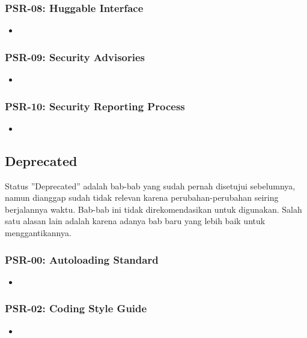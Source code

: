 \subsubsection{PSR-08: Huggable Interface}
\label{subsubsec:psr08}
\begin{itemize}
	\item
\end{itemize}

\subsubsection{PSR-09: Security Advisories}
\label{subsubsec:psr09}
\begin{itemize}
	\item
\end{itemize}

\subsubsection{PSR-10: Security Reporting Process}
\label{subsubsec:psr10}
\begin{itemize}
	\item
\end{itemize}


\subsection{Deprecated}
\label{subsec:deprecated}
Status ''Deprecated'' adalah bab-bab yang sudah pernah disetujui sebelumnya, namun dianggap sudah tidak relevan karena perubahan-perubahan seiring berjalannya waktu. Bab-bab ini tidak direkomendasikan untuk digunakan. Salah satu alasan lain adalah karena adanya bab baru yang lebih baik untuk menggantikannya.

\subsubsection{PSR-00: Autoloading Standard}
\label{subsubsec:psr00}
\begin{itemize}
	\item
\end{itemize}

\subsubsection{PSR-02: Coding Style Guide}
\label{subsubsec:psr02}
\begin{itemize}
	\item
\end{itemize}

